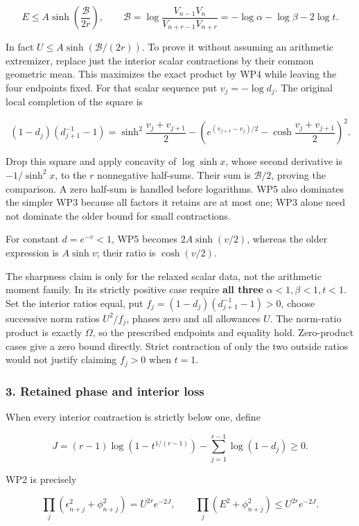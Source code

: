 \[
E\le A\sinh\!\left(\frac{\mathcal B}{2r}\right),\qquad
\mathcal B=\log\frac{V_{n-1}V_n}{V_{n+r-1}V_{n+r}}
=-\log\alpha-\log\beta-2\log t.
\]

In fact \(U\le A\sinh(\mathcal B/(2r))\). To prove it without assuming an arithmetic extremizer, replace just the interior scalar contractions by their common geometric mean. This maximizes the exact product by WP4 while leaving the four endpoints fixed. For that scalar sequence put \(v_j=-\log d_j\). The original local completion of the square is

\[
(1-d_j)(d_{j+1}^{-1}-1)
=\sinh^2\frac{v_j+v_{j+1}}2
-\left(e^{(v_{j+1}-v_j)/2}-\cosh\frac{v_j+v_{j+1}}2\right)^2.
\]

Drop this square and apply concavity of \(\log\sinh x\), whose second derivative is \(-1/\sinh^2x\), to the \(r\) nonnegative half-sums. Their sum is \(\mathcal B/2\), proving the comparison. A zero half-sum is handled before logarithms. WP5 also dominates the simpler WP3 because all factors it retains are at most one; WP3 alone need not dominate the older bound for small contractions.

For constant \(d=e^{-v}<1\), WP5 becomes \(2A\sinh(v/2)\), whereas the older expression is \(A\sinh v\); their ratio is \(\cosh(v/2)\).

The sharpness claim is only for the relaxed scalar data, not the arithmetic moment family. In its strictly positive case require \textbf{all three} \(\alpha<1,\beta<1,t<1\). Set the interior ratios equal, put \(f_j=(1-d_j)(d_{j+1}^{-1}-1)>0\), choose successive norm ratios \(U^2/f_j\), phases zero and all allowances \(U\). The norm-ratio product is exactly \(\Omega\), so the prescribed endpoints and equality hold. Zero-product cases give a zero bound directly. Strict contraction of only the two outside ratios would not justify claiming \(f_j>0\) when \(t=1\).

\subsubsection{3. Retained phase and interior loss}\label{endpoint-window_product_owner--retained-phase-and-interior-loss}

When every interior contraction is strictly below one, define

\[
J=(r-1)\log(1-t^{1/(r-1)})-\sum_{j=1}^{r-1}\log(1-d_j)\ge0.
\]

WP2 is precisely

\[
\prod_j(\epsilon_{n+j}^2+\phi_{n+j}^2)=U^{2r}e^{-2J},\qquad
\prod_j(E^2+\phi_{n+j}^2)\le U^{2r}e^{-2J}. \tag{WP7}
\]


